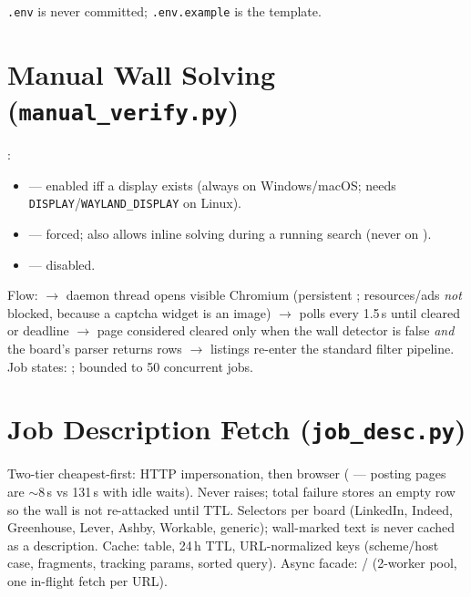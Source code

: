 \documentclass[11pt,a4paper]{article}
\newcommand{\file}[1]{\texttt{\small #1}}
\newcommand{\env}[1]{\texttt{\small #1}}
\begin{document}
\file{.env} is never committed; \file{.env.example} is the template.

\section{Manual Wall Solving (\file{manual\_verify.py})}
\label{sec:manual}

:
\begin{itemize}[leftmargin=2em]
  \item {} --- enabled iff a display exists (always on
        Windows/macOS; needs \env{DISPLAY}/\env{WAYLAND\_DISPLAY} on Linux).
  \item {} --- forced; also allows inline solving during a running
        search (never on ).
  \item {} --- disabled.
\end{itemize}

Flow:  $\rightarrow$ daemon thread opens visible
Chromium (persistent ; resources/ads
\emph{not} blocked, because a captcha widget is an image) $\rightarrow$
polls every 1.5\,s until cleared or deadline $\rightarrow$ page considered
cleared only when the wall detector is false \emph{and} the board's parser
returns rows $\rightarrow$ listings re-enter the standard filter pipeline.
Job states: ; bounded to 50 concurrent jobs.

\section{Job Description Fetch (\file{job\_desc.py})}
\label{sec:jobdesc}

Two-tier cheapest-first: HTTP impersonation, then browser
( --- posting pages are $\sim$8\,s vs 131\,s with
idle waits). Never raises; total failure stores an empty row so the wall is
not re-attacked until TTL. Selectors per board (LinkedIn, Indeed,
Greenhouse, Lever, Ashby, Workable, generic); wall-marked text is never
cached as a description. Cache:  table, 24\,h TTL,
URL-normalized keys (scheme/host case, fragments, tracking params, sorted
query). Async facade:  /  (2-worker pool,
one in-flight fetch per URL).
\end{document}
